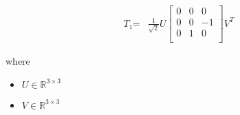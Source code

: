 \documentclass[12pt]{article}
\begin{document}
\begin{align*}
\textit{T₁} = & \frac{1}{ \sqrt{2}}\textit{U}\begin{bmatrix}
0 & 0 & 0\\
0 & 0 & -1\\
0 & 1 & 0\\
\end{bmatrix}\textit{V}^T
\end{align*}

where
\begin{itemize}
\item $\textit{U} \in \mathbb{R}^{ 3 \times 3 }$
\item $\textit{V} \in \mathbb{R}^{ 3 \times 3 }$
\end{itemize}
\end{document}

